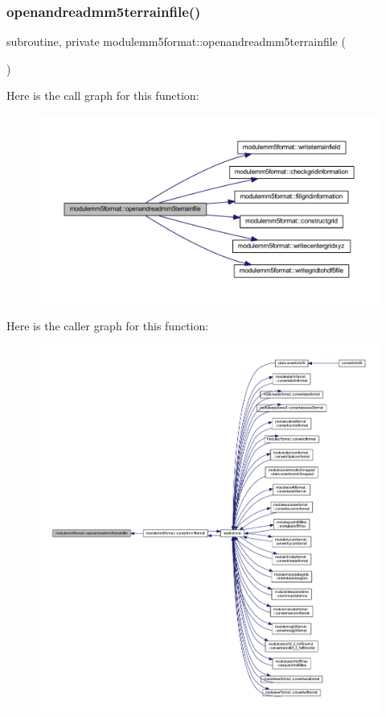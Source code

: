 \subsubsection{\texorpdfstring{openandreadmm5terrainfile()}{openandreadmm5terrainfile()}}
{\footnotesize\ttfamily subroutine, private modulemm5format\+::openandreadmm5terrainfile (\begin{DoxyParamCaption}{ }\end{DoxyParamCaption})\hspace{0.3cm}{\ttfamily [private]}}

Here is the call graph for this function\+:\nopagebreak
\begin{figure}[H]
\begin{center}
\leavevmode
\includegraphics[width=350pt]{namespacemodulemm5format_a1f3cc8db72c3a71a34ba6b95a7658651_cgraph}
\end{center}
\end{figure}
Here is the caller graph for this function\+:\nopagebreak
\begin{figure}[H]
\begin{center}
\leavevmode
\includegraphics[width=350pt]{namespacemodulemm5format_a1f3cc8db72c3a71a34ba6b95a7658651_icgraph}
\end{center}
\end{figure}

